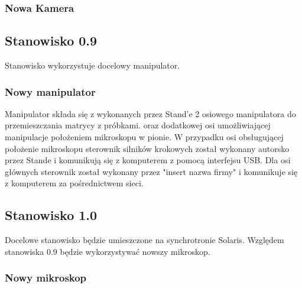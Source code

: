 \documentclass[11pt,a4paper]{article}
\begin{document}
    \subsubsection{Nowa Kamera}

    \subsection{Stanowisko 0.9}
    Stanowisko wykorzystuje docelowy manipulator.

    \subsubsection{Nowy manipulator}
    Manipulator składa się z wykonanych przez Stand'e 2 osiowego manipulatora do przemieszczania matrycy z próbkami. oraz dodatkowej osi umożliwiającej manipulacje położeniem mikroskopu w pionie. W przypadku osi obsługującej położenie mikroskopu sterownik silników krokowych został wykonany autorsko przez Stande i komunikują się z komputerem z pomocą interfejsu USB. Dla osi głównych sterownik został wykonany przez "insert nazwa firmy" i komunikuje się z komputerem za pośrednictwem sieci.

    \subsection{Stanowisko 1.0}
    Docelowe stanowisko będzie umieszczone na synchrotronie Solaris. Względem stanowiska 0.9 będzie wykorzystywać nowszy mikroskop.

    \subsubsection{Nowy mikroskop}
\end{document}
